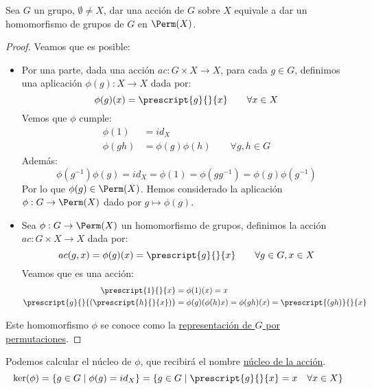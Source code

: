 \begin{prop}
    Sea $G$ un grupo, $\emptyset \neq X$, dar una acción de $G$ sobre $X$ equivale a dar un homomorfismo de grupos de $G$ en $\Perm(X)$.
    \begin{proof}
        Veamos que es posible:
        \begin{itemize}
            \item Por una parte, dada una acción $ac:G\times X \to X$, para cada $g\in G$, definimos una aplicación $\phi(g):X\to X$ dada por:
                \begin{equation*}
                    \phi(g)(x) = \prescript{g}{}{x} \qquad \forall x\in X
                \end{equation*}
                Vemos que $\phi$ cumple:
                \begin{align*}
                    \phi(1) &= id_X \\
                    \phi(gh) &= \phi(g) \phi(h) \qquad \forall g,h\in G
                \end{align*}
                Además:
                \begin{equation*}
                    \phi(g^{-1})\phi(g) = id_X = \phi(1) = \phi(gg^{-1}) = \phi(g)\phi(g^{-1}) 
                \end{equation*}
                Por lo que $\phi(g)\in \Perm(X)$. Hemos considerado la aplicación $\phi:G\to \Perm(X)$ dado por $g\longmapsto \phi(g)$.
            \item Sea $\phi:G\to \Perm(X)$ un homomorfismo de grupos, definimos la acción $ac:G\times X \to X$ dada por:
                \begin{equation*}
                    ac(g,x) = \phi(g)(x) = \prescript{g}{}{x} \qquad \forall g\in G, x\in X
                \end{equation*}
                Veamos que es una acción:
                \begin{align*}
                    \prescript{1}{}{x} &= \phi(1)(x) = x \\
                    \prescript{g}{}{(\prescript{h}{}{x})} &= \phi(g)(\phi(h)x) = \phi(gh)(x) = \prescript{(gh)}{}{x}
                \end{align*}
        \end{itemize}
        Este homomorfismo $\phi$ se conoce como la \underline{representación de $G$ por permutaciones}.
    \end{proof}
\end{prop}

Podemos calcular el núcleo de $\phi$, que recibirá el nombre \underline{núcleo de la acción}.
\begin{equation*}
    \ker(\phi) = \{g\in G\mid \phi(g) = id_X\} = \{g\in G \mid \prescript{g}{}{x} = x \quad \forall x\in X\}
\end{equation*}

